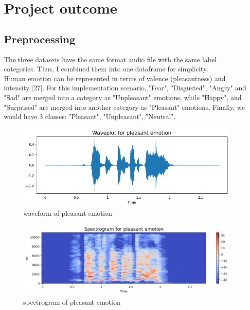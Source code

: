\section{Project outcome}
\subsection{Preprocessing}
The three datasets have the same format audio file with the same label categories. Thus, I combined them into one dataframe for simplicity.  \\

Human emotion can be represented in terms of valence (pleasantness) and intensity [27]. For this implementation scenario, "Fear", "Disgusted", "Angry" and "Sad" are merged into a category as "Unpleasant" emotions, while "Happy", and "Surprised" are merged into another category as "Pleasant" emotions.
Finally, we would have 3 classes: "Pleasant", "Unpleasant", "Neutral".

\begin{center}
    \begin{figure}[!htp]
        \centering
        \includegraphics[width=0.8 \textwidth]{image/waveform_pleasant.png}
        \caption{waveform of pleasant emotion}
        \label{subsection}
    \end{figure}
    \end{center}

\begin{center}
    \begin{figure}[!htp]
        \centering
        \includegraphics[width=0.8 \textwidth]{image/spectrogram_pleasant.png}
        \caption{spectrogram of pleasant emotion}
        \label{subsection}
    \end{figure}
    \end{center}

